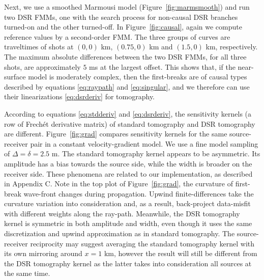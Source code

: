 Next, we use a smoothed Marmousi model (Figure~\ref{fig:marmsmooth}) and run two DSR FMMs, one with the search 
process for non-causal DSR branches turned-on and the other turned-off. In Figure~\ref{fig:causal}, again we 
compute reference values by a second-order FMM. The three groups of curves are 
traveltimes of shots at $(0,0)$ km, $(0.75,0)$ km and $(1.5,0)$ km, respectively. The maximum absolute 
differences between the two DSR FMMs, for all three shots, are approximately $5$ ms at the largest offset. This 
shows that, if the near-surface model is moderately complex, then the first-breaks are of causal 
types described by equations \ref{eq:raypath} and \ref{eq:singular}, and we therefore can use their 
linearizations \ref{eq:dsrderiv} for tomography.

According to equations \ref{eq:stdderiv} and \ref{eq:dsrderiv}, the sensitivity 
kernels (a row of Frech\'{e}t derivative matrix) of standard tomography and DSR 
tomography are different. Figure~\ref{fig:grad} compares sensitivity kernels for the same 
source-receiver pair in a constant velocity-gradient model. We use a fine model sampling of 
$\Delta = \delta = 2.5$ m. The standard tomography kernel appears to be asymmetric. Its amplitude has a bias 
towards the source side, while the width is broader on the receiver side. These phenomena are related to our 
implementation, as described in Appendix C. Note in the top plot of Figure~\ref{fig:grad}, the curvature of 
first-break wave-front changes during propagation. Upwind finite-differences 
take the curvature variation into consideration and, as a result, back-project 
data-misfit with different weights along the ray-path. Meanwhile, the DSR tomography kernel is symmetric in both 
amplitude and width, even though it uses the same discretization and upwind approximation as 
in standard tomography. The source-receiver reciprocity may suggest averaging the standard tomography kernel with 
its own mirroring around $x = 1$ km, however the result will still be different from the DSR tomography kernel as 
the latter takes into consideration all sources at the same time.

